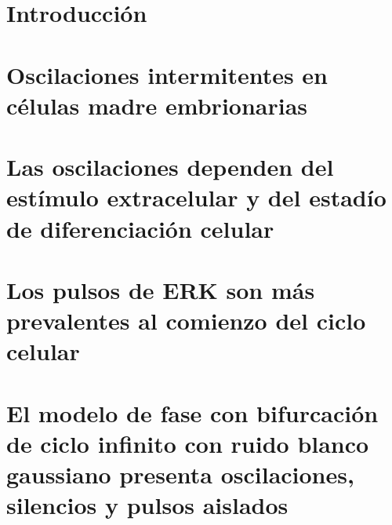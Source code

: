 \documentclass[graybox,envcountchap,sectrefs]{svmono}
\begin{document}
\frontmatter%
%


%
%


\tableofcontents



\mainmatter%

\chapter{Introducción}
\label{ch1}


\chapter{Oscilaciones intermitentes en células madre embrionarias}
\label{ch2}


\chapter{Las oscilaciones dependen del estímulo extracelular y del estadío de diferenciación celular}
\label{ch3}


\chapter{Los pulsos de ERK son más prevalentes al comienzo del ciclo celular}
\label{ch4}


\chapter{El modelo de fase con bifurcación de ciclo infinito con ruido blanco gaussiano presenta oscilaciones, silencios y pulsos aislados}
\label{ch5}

\end{document}
